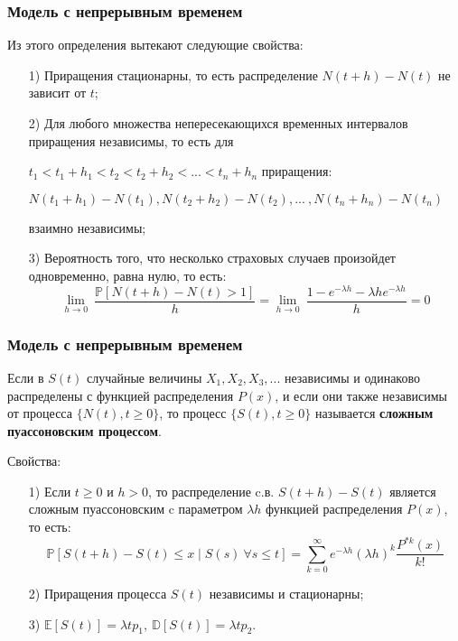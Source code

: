 \documentclass[10pt]{beamer}
\begin{document}
\begin{frame}
\frametitle{Модель с непрерывным временем}
\noindent
Из этого определения вытекают следующие свойства:
\begin{enumerate}
    \item[1)] Приращения стационарны, то есть распределение $N(t+h)-N(t)$ не зависит от $t$;
    \item[2)] Для любого множества непересекающихся временных интервалов приращения независимы,
    то есть для
    \par\smallskip
    $t_{1}<t_{1}+h_{1}<t_{2}<t_{2}+h_{2}<...<t_{n}+h_{n}$
    приращения:
    \par\smallskip
    $N(t_{1}+h_{1})-N(t_{1}), N(t_{2}+h_{2})-N(t_{2}),...\:,N(t_{n}+h_{n})-N(t_{n})$
    \par\smallskip
    взаимно независимы;
    \item[3)] Вероятность того, что несколько страховых случаев произойдет одновременно, равна нулю,
    то есть:
    \begin{equation*}
        \lim_{h \rightarrow 0} \: \frac{\mathbb{P}[N(t+h)-N(t)>1]}{h} =
        \lim_{h \rightarrow 0} \: \frac{1-e^{- \lambda h}- \lambda he^{- \lambda h}}{h} = 0
    \end{equation*}
\end{enumerate}
\end{frame}


\begin{frame}
\frametitle{Модель с непрерывным временем}
\noindent
Если в $S(t)$ случайные величины $X_{1}, X_{2}, X_{3}, ...$ независимы и одинаково распределены с функцией распределения $P(x)$, и если они также независимы от процесса $\big\{N(t), t\geq 0\big\}$, то процесс $\big\{S(t), t\geq 0\big\}$ называется \textbf{сложным пуассоновским процессом}.
\begin{block} {Свойства:}
\begin{enumerate}
    \item[1)] Если $t\geq 0 $ и $h > 0$, то распределение c.в. $S(t + h) - S(t)$ является сложным пуассоновским c параметром $\lambda h$ функцией распределения $P(x)$, то есть:
    \begin{equation*}
        \mathbb{P}[S(t+h)-S(t)\leq x \mid S(s)\ \forall s \leq t] = 
        \sum_{k=0}^{ \infty }e^{- \lambda h}(\lambda h)^{k} \frac{P^{\ast k}(x) }{k!}
    \end{equation*}
    \item[2)] Приращения процесса $S(t)$ независимы и стационарны;
    \item[3)] $\mathbb{E}[S(t)] = \lambda t p_1,\ \mathbb{D}[S(t)] = \lambda t p_2$.
\end{enumerate}
\end{block}
\end{frame}
\end{document}
